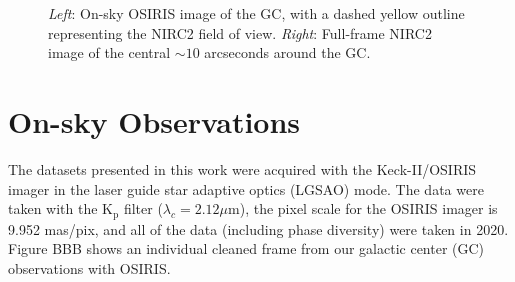 \documentclass[]{spie}  %
\begin{document}
\begin{figure}[!h]
  \caption{\footnotesize \textit{Left}: On-sky OSIRIS image of the GC, with a dashed yellow outline representing the NIRC2 field of view. \textit{Right}: Full-frame NIRC2 image of the central ${\sim}10$ arcseconds around the GC.} \label{fig:gc_osiris_nirc2}
\end{figure}

\section{On-sky Observations}\label{sec:on_sky_obs}
The datasets presented in this work were acquired with the Keck-II/OSIRIS imager in the laser guide star adaptive optics (LGSAO) mode. The data were taken with the K$_{\textrm{p}}$ filter ($\lambda_{c} = 2.12\mu$m), the pixel scale for the OSIRIS imager is 9.952 mas/pix, and all of the data (including phase diversity) were taken in 2020. Figure BBB shows an individual cleaned frame from our galactic center (GC) observations with OSIRIS.
\end{document}
